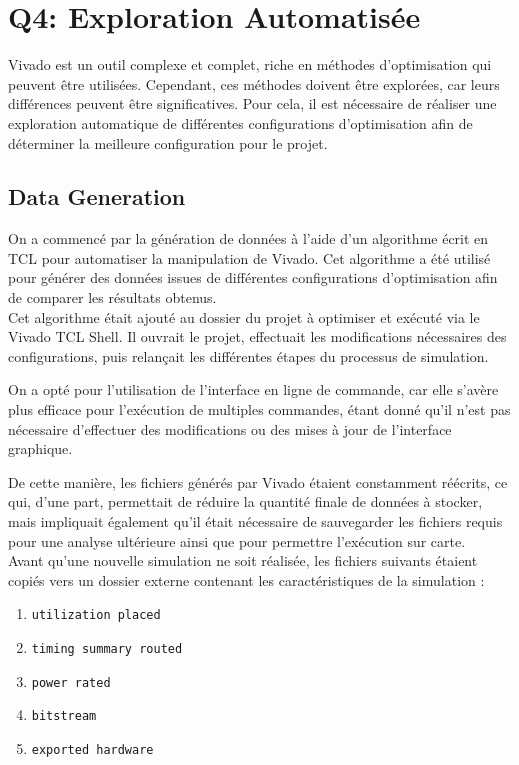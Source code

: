 \documentclass[../CSC_5RO07_TA.tex]{subfiles}
\begin{document}
\section{Q4: Exploration Automatisée}
\noindent Vivado est un outil complexe et complet, riche en méthodes d'optimisation qui peuvent être utilisées. Cependant, ces méthodes doivent être explorées, car leurs différences peuvent être significatives. Pour cela, il est nécessaire de réaliser une exploration automatique de différentes configurations d'optimisation afin de déterminer la meilleure configuration pour le projet.

\subsection{Data Generation}
\noindent On a commencé par la génération de données à l'aide d'un algorithme écrit en TCL pour automatiser la manipulation de Vivado. Cet algorithme a été utilisé pour générer des données issues de différentes configurations d'optimisation afin de comparer les résultats obtenus.\\

\noindent Cet algorithme était ajouté au dossier du projet à optimiser et exécuté via le Vivado TCL Shell. Il ouvrait le projet, effectuait les modifications nécessaires des configurations, puis relançait les différentes étapes du processus de simulation.

\begin{remark}
    On a opté pour l'utilisation de l'interface en ligne de commande, car elle s'avère plus efficace pour l'exécution de multiples commandes, étant donné qu'il n'est pas nécessaire d'effectuer des modifications ou des mises à jour de l'interface graphique.
\end{remark}

\noindent De cette manière, les fichiers générés par Vivado étaient constamment réécrits, ce qui, d'une part, permettait de réduire la quantité finale de données à stocker, mais impliquait également qu'il était nécessaire de sauvegarder les fichiers requis pour une analyse ultérieure ainsi que pour permettre l'exécution sur carte.\\

\noindent Avant qu'une nouvelle simulation ne soit réalisée, les fichiers suivants étaient copiés vers un dossier externe contenant les caractéristiques de la simulation :

\begin{enumerate}[noitemsep]
    \item \texttt{utilization placed}
    \item \texttt{timing summary routed}
    \item \texttt{power rated}
    \item \texttt{bitstream}
    \item \texttt{exported hardware}
\end{enumerate}
\end{document}
